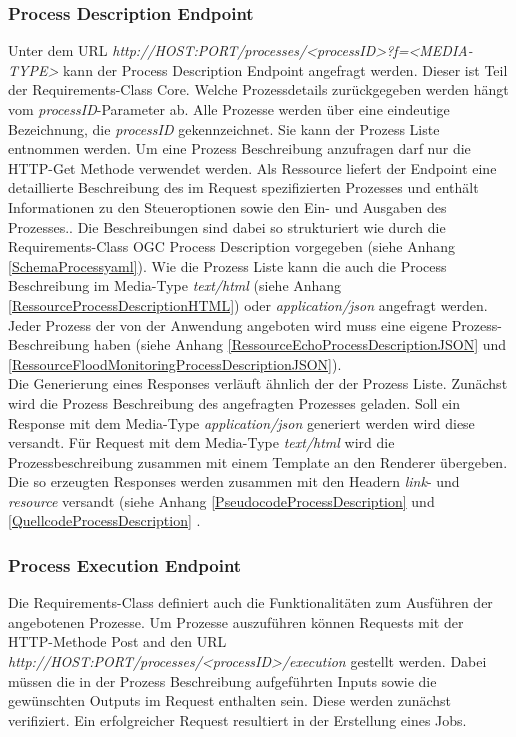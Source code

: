 \subsubsection{Process Description Endpoint}
Unter dem URL \textit{http://HOST:PORT/processes/<processID>?f=<MEDIA-TYPE>} kann der Process Description Endpoint angefragt werden. 
Dieser ist Teil der Requirements-Class Core. 
Welche Prozessdetails zurückgegeben werden hängt vom \textit{processID}-Parameter ab. Alle Prozesse werden über eine 
eindeutige Bezeichnung, die \textit{processID} gekennzeichnet. 
Sie kann der Prozess Liste entnommen werden. Um eine Prozess Beschreibung anzufragen darf nur die HTTP-Get Methode verwendet werden.   
Als Ressource liefert der Endpoint eine detaillierte Beschreibung des im Request spezifizierten Prozesses und enthält Informationen 
zu den Steueroptionen sowie den Ein- und Ausgaben des Prozesses.. 
Die Beschreibungen sind dabei so strukturiert wie durch die Requirements-Class OGC Process Description vorgegeben (siehe Anhang \ref{SchemaProcessyaml}). 
Wie die Prozess Liste kann die auch die Process Beschreibung im Media-Type \textit{text/html} (siehe Anhang \ref{RessourceProcessDescriptionHTML}) 
oder \textit{application/json} angefragt werden.
Jeder Prozess der von der Anwendung angeboten wird muss eine eigene Prozess-Beschreibung haben (siehe Anhang \ref{RessourceEchoProcessDescriptionJSON} und 
\ref{RessourceFloodMonitoringProcessDescriptionJSON}).\\


Die Generierung eines Responses verläuft ähnlich der der Prozess Liste. Zunächst wird die Prozess Beschreibung des angefragten Prozesses geladen. 
Soll ein Response mit dem Media-Type \textit{application/json} generiert werden wird diese versandt. 
Für Request mit dem Media-Type \textit{text/html} wird die Prozessbeschreibung zusammen mit einem Template an den Renderer übergeben. 
Die so erzeugten Responses werden zusammen mit den Headern \textit{link}- und \textit{resource} versandt (siehe Anhang \ref{PseudocodeProcessDescription} 
und \ref{QuellcodeProcessDescription} \cite{ogc_api_processes_core}.

\subsubsection{Process Execution Endpoint}
Die Requirements-Class definiert auch die Funktionalitäten zum Ausführen der angebotenen Prozesse.
Um Prozesse auszuführen können Requests mit der HTTP-Methode Post and den URL \textit{http://HOST:PORT/processes/<processID>/execution} gestellt werden.
Dabei müssen die in der Prozess Beschreibung aufgeführten Inputs sowie die gewünschten Outputs im Request enthalten sein. 
Diese werden zunächst verifiziert. Ein erfolgreicher Request resultiert in der Erstellung eines Jobs.              

